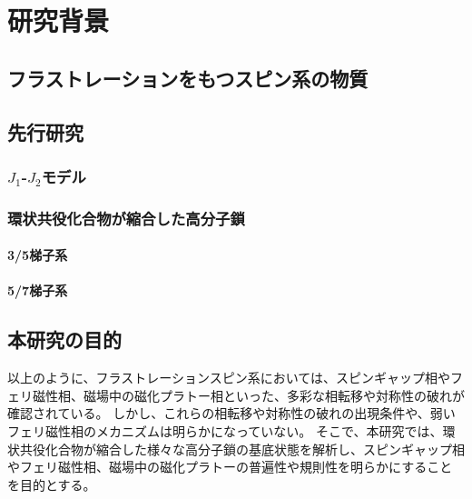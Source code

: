 \chapter{研究背景}
\section{フラストレーションをもつスピン系の物質}

\section{先行研究}
\subsection{$J_1$-$J_2$モデル}
\subsection{環状共役化合物が縮合した高分子鎖}
\subsubsection{3/5梯子系}
\subsubsection{5/7梯子系}

\section{本研究の目的}
以上のように、フラストレーションスピン系においては、スピンギャップ相やフェリ磁性相、磁場中の磁化プラトー相といった、多彩な相転移や対称性の破れが確認されている。
しかし、これらの相転移や対称性の破れの出現条件や、弱いフェリ磁性相のメカニズムは明らかになっていない。
そこで、本研究では、環状共役化合物が縮合した様々な高分子鎖の基底状態を解析し、スピンギャップ相やフェリ磁性相、磁場中の磁化プラトーの普遍性や規則性を明らかにすることを目的とする。
